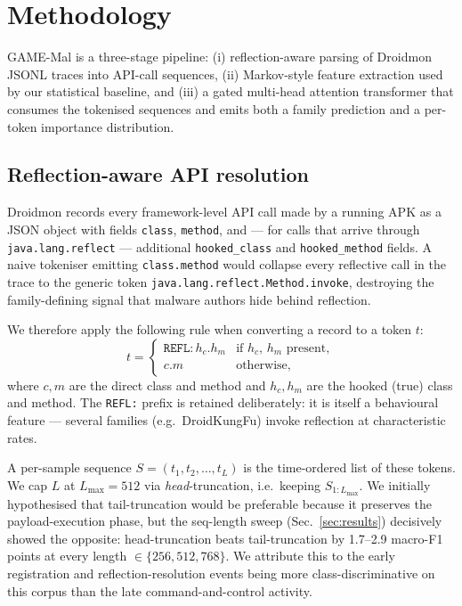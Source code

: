 \section{Methodology}
\label{sec:methodology}

GAME-Mal is a three-stage pipeline: (i) reflection-aware parsing of
Droidmon JSONL traces into API-call sequences, (ii) Markov-style
feature extraction used by our statistical baseline, and (iii) a
gated multi-head attention transformer that consumes the tokenised
sequences and emits both a family prediction and a per-token
importance distribution.

\subsection{Reflection-aware API resolution}
\label{sec:reflection}

Droidmon records every framework-level API call made by a running
APK as a JSON object with fields \texttt{class}, \texttt{method},
and — for calls that arrive through \texttt{java.lang.reflect} —
additional \texttt{hooked\_class} and \texttt{hooked\_method}
fields. A naive tokeniser emitting \texttt{class.method} would
collapse every reflective call in the trace to the generic token
\texttt{java.lang.reflect.Method.invoke}, destroying the
family-defining signal that malware authors hide behind reflection.

We therefore apply the following rule when converting a record to a
token $t$:
\[
  t =
  \begin{cases}
    \texttt{REFL:}\,h_c.h_m & \text{if } h_c,\, h_m \text{ present},\\
    c.m & \text{otherwise},
  \end{cases}
\]
where $c,m$ are the direct class and method and $h_c,h_m$ are the
hooked (true) class and method. The \texttt{REFL:} prefix is retained
deliberately: it is itself a behavioural feature — several families
(e.g.\ DroidKungFu) invoke reflection at characteristic rates.

A per-sample sequence $S = (t_1, t_2, \ldots, t_L)$ is the
time-ordered list of these tokens. We cap $L$ at $L_{\max}=512$ via
\emph{head}-truncation, i.e.\ keeping $S_{1{:}L_{\max}}$. We initially
hypothesised that tail-truncation would be preferable because it
preserves the payload-execution phase, but the seq-length sweep
(Sec.~\ref{sec:results}) decisively showed the opposite: head-truncation
beats tail-truncation by 1.7--2.9 macro-F1 points at every length
$\in\{256, 512, 768\}$. We attribute this to the early registration
and reflection-resolution events being more class-discriminative on
this corpus than the late command-and-control activity.


